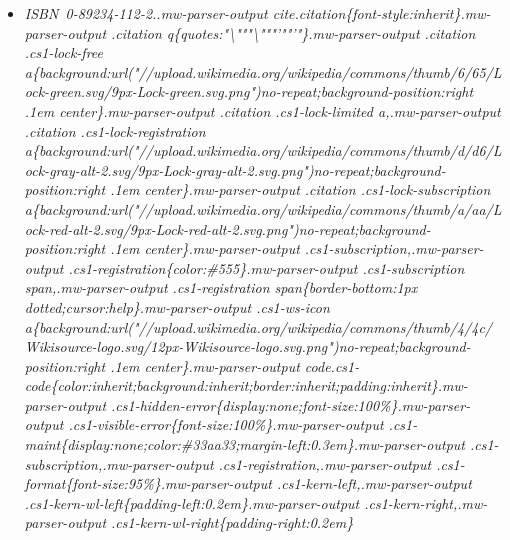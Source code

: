 \begin{itemize}
\item
  \emph{ISBN~0-89234-112-2..mw-parser-output
  cite.citation\{font-style:inherit\}.mw-parser-output .citation
  q\{quotes:"\textbackslash{}"""\textbackslash{}"""'""'"\}.mw-parser-output
  .citation .cs1-lock-free
  a\{background:url("//upload.wikimedia.org/wikipedia/commons/thumb/6/65/Lock-green.svg/9px-Lock-green.svg.png")no-repeat;background-position:right
  .1em center\}.mw-parser-output .citation .cs1-lock-limited
  a,.mw-parser-output .citation .cs1-lock-registration
  a\{background:url("//upload.wikimedia.org/wikipedia/commons/thumb/d/d6/Lock-gray-alt-2.svg/9px-Lock-gray-alt-2.svg.png")no-repeat;background-position:right
  .1em center\}.mw-parser-output .citation .cs1-lock-subscription
  a\{background:url("//upload.wikimedia.org/wikipedia/commons/thumb/a/aa/Lock-red-alt-2.svg/9px-Lock-red-alt-2.svg.png")no-repeat;background-position:right
  .1em center\}.mw-parser-output .cs1-subscription,.mw-parser-output
  .cs1-registration\{color:\#555\}.mw-parser-output .cs1-subscription
  span,.mw-parser-output .cs1-registration span\{border-bottom:1px
  dotted;cursor:help\}.mw-parser-output .cs1-ws-icon
  a\{background:url("//upload.wikimedia.org/wikipedia/commons/thumb/4/4c/Wikisource-logo.svg/12px-Wikisource-logo.svg.png")no-repeat;background-position:right
  .1em center\}.mw-parser-output
  code.cs1-code\{color:inherit;background:inherit;border:inherit;padding:inherit\}.mw-parser-output
  .cs1-hidden-error\{display:none;font-size:100\%\}.mw-parser-output
  .cs1-visible-error\{font-size:100\%\}.mw-parser-output
  .cs1-maint\{display:none;color:\#33aa33;margin-left:0.3em\}.mw-parser-output
  .cs1-subscription,.mw-parser-output
  .cs1-registration,.mw-parser-output
  .cs1-format\{font-size:95\%\}.mw-parser-output
  .cs1-kern-left,.mw-parser-output
  .cs1-kern-wl-left\{padding-left:0.2em\}.mw-parser-output
  .cs1-kern-right,.mw-parser-output
  .cs1-kern-wl-right\{padding-right:0.2em\}}
\end{itemize}

